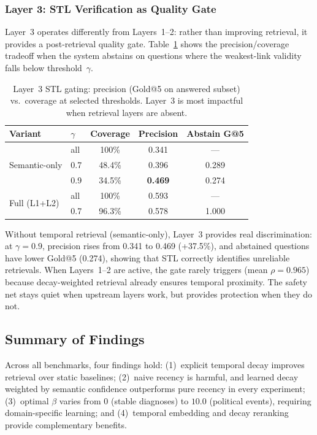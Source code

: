 \documentclass[conference]{IEEEtran}
\begin{document}
\subsubsection{Layer 3: STL Verification as Quality Gate}

Layer~3 operates differently from Layers~1--2: rather than improving retrieval, it provides a post-retrieval quality gate. Table~\ref{tab:layer3} shows the precision/coverage tradeoff when the system abstains on questions where the weakest-link validity falls below threshold~$\gamma$.

\begin{table}[t]
\centering
\caption{Layer~3 STL gating: precision (Gold@5 on answered subset) vs.\ coverage at selected thresholds. Layer~3 is most impactful when retrieval layers are absent.}
\label{tab:layer3}
\begin{tabular}{@{}llccc@{}}
\toprule
\textbf{Variant} & \textbf{$\gamma$} & \textbf{Coverage} & \textbf{Precision} & \textbf{Abstain G@5} \\
\midrule
\multirow{3}{*}{Semantic-only} & all & 100\% & 0.341 & --- \\
 & 0.7 & 48.4\% & 0.396 & 0.289 \\
 & 0.9 & 34.5\% & \textbf{0.469} & 0.274 \\
\midrule
\multirow{2}{*}{Full (L1+L2)} & all & 100\% & 0.593 & --- \\
 & 0.7 & 96.3\% & 0.578 & 1.000 \\
\bottomrule
\end{tabular}
\end{table}

Without temporal retrieval (semantic-only), Layer~3 provides real discrimination: at $\gamma{=}0.9$, precision rises from 0.341 to 0.469 (+37.5\%), and abstained questions have lower Gold@5 (0.274), showing that STL correctly identifies unreliable retrievals. When Layers~1--2 are active, the gate rarely triggers (mean $\rho = 0.965$) because decay-weighted retrieval already ensures temporal proximity. The safety net stays quiet when upstream layers work, but provides protection when they do not.

\subsection{Summary of Findings}

Across all benchmarks, four findings hold: (1)~explicit temporal decay improves retrieval over static baselines; (2)~naive recency is harmful, and learned decay weighted by semantic confidence outperforms pure recency in every experiment; (3)~optimal $\beta$ varies from $0$ (stable diagnoses) to $10.0$ (political events), requiring domain-specific learning; and (4)~temporal embedding and decay reranking provide complementary benefits.
\end{document}
